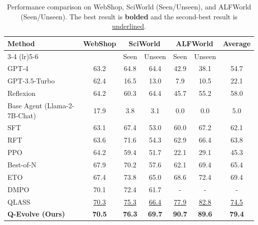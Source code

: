\documentclass{article}
\theoremstyle{plain}
\theoremstyle{definition}
\theoremstyle{remark}
\begin{document}
\begin{table}[t]
\centering
\small
\caption{Performance comparison on WebShop, SciWorld (Seen/Unseen), and ALFWorld (Seen/Unseen). 
The best result is \textbf{bolded} and the second-best result is \underline{underlined}.}
\begin{tabular}{l|c|cc|cc|c}
\toprule
\multirow{2}{*}{Method} & \multirow{2}{*}{WebShop} & \multicolumn{2}{c|}{SciWorld} & \multicolumn{2}{c}{ALFWorld} & \multirow{2}{*}{Average} \\
\cmidrule(lr){3-4} \cmidrule(lr){5-6}
 & & Seen & Unseen & Seen & Unseen & \\
\midrule
GPT-4              & 63.2 & 64.8 & 64.4 & 42.9 & 38.1 & 54.7 \\
GPT-3.5-Turbo      & 62.4 & 16.5 & 13.0 & 7.9  & 10.5 & 22.1 \\
Reflexion~\citep{shinn2023reflexion} & 64.2 & 60.3 & 64.4 & 45.7 & 55.2 & 58.0 \\
\midrule
Base Agent (Llama-2-7B-Chat) & 17.9 & 3.8  & 3.1  & 0.0  & 0.0  & 5.0 \\
SFT~\cite{chen2023fireact}                & 63.1 & 67.4 & 53.0 & 60.0 & 67.2 & 62.1 \\
RFT~\citep{zhang2023cumulative} & 63.6 & 71.6 & 54.3 & 62.9 & 66.4 & 63.8 \\
PPO~\citep{schulman2017proximalpolicyoptimizationalgorithms} & 64.2 & 59.4 & 51.7 & 22.1 & 29.1 & 45.3 \\
Best-of-N          & 67.9 & 70.2 & 57.6 & 62.1 & 69.4 & 65.4 \\
ETO~\citep{song2024trial} & 67.4 & 73.8 & 65.0 & 68.6 & 72.4 & 69.4 \\
DMPO~\citep{dmpo} & 70.1 & 72.4 & 61.7 & - & - & - \\

QLASS~\cite{lin2025qlass}              & \underline{70.3} & \underline{75.3 }& \underline{66.4} & \underline{77.9} & \underline{82.8} & \underline{74.5} \\
\midrule

\textbf{Q-Evolve (Ours)}               &  \textbf{70.5} & \textbf{76.3} & \textbf{69.7 } & \textbf{90.7}  & \textbf{89.6}  &  \textbf{79.4}  \\
\bottomrule
\end{tabular}
\label{tab:main-results}
\end{table}
\end{document}
